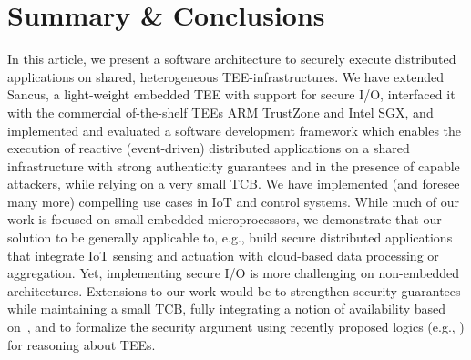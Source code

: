 \section{Summary \& Conclusions} \label{sec:conclusions}

In this article, we present a software architecture to securely execute
distributed applications on shared, heterogeneous \ac{TEE}-infrastructures. We
have extended Sancus, a light-weight embedded \ac{TEE} with support for secure
I/O, interfaced it with the commercial of-the-shelf \acp{TEE} ARM TrustZone and
Intel SGX, and implemented and evaluated a software development framework which
enables the execution of reactive (event-driven) distributed applications on a
shared infrastructure with strong authenticity guarantees and in the presence of
capable attackers, while relying on a very small TCB. We have implemented (and
foresee many more) compelling use cases in IoT and control systems.  While much
of our work is focused on small embedded microprocessors, we demonstrate that
our solution to be generally applicable to, e.g., build secure distributed
applications that integrate IoT sensing and actuation with cloud-based data
processing or aggregation.  Yet, implementing secure I/O is more challenging on
non-embedded architectures.  Extensions to our work would be to strengthen
security guarantees while maintaining a small TCB, fully integrating a notion of
availability based on~\cite{alder_2021_aion}, and to formalize the security
argument using recently proposed logics (e.g., \cite{warinschi}) for reasoning
about \acp{TEE}.

